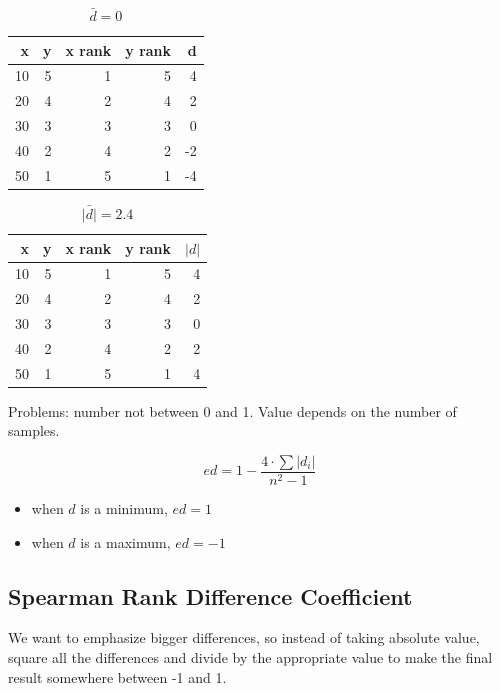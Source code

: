 \documentclass[landscape]{exam}
\begin{document}
  \begin{table}[H]
    \centering
    \begin{tabular}{rrrrr}
      \toprule
      x  & y & x rank & y rank & d \\
      \midrule
      10 & 5 & 1      & 5      & 4 \\
      20 & 4 & 2      & 4      & 2 \\
      30 & 3 & 3      & 3      & 0 \\
      40 & 2 & 4      & 2      & -2 \\
      50 & 1 & 5      & 1      & -4 \\
      \bottomrule
    \end{tabular}
    \caption{$\bar{d} = 0$}
  \end{table}

  \begin{table}[H]
    \centering
    \begin{tabular}{rrrrr}
      \toprule
      x  & y & x rank & y rank & $|d|$ \\
      \midrule
      10 & 5 & 1      & 5      & 4 \\
      20 & 4 & 2      & 4      & 2 \\
      30 & 3 & 3      & 3      & 0 \\
      40 & 2 & 4      & 2      & 2 \\
      50 & 1 & 5      & 1      & 4 \\
      \bottomrule
    \end{tabular}
    \caption{$\bar{|d|} = 2.4$}
  \end{table}

  Problems: number not between 0 and 1. Value depends on the number of samples.

  \[
    ed = 1 - \frac{4 \cdot \sum |d_i|}{n^2 - 1}
  \]

  \begin{itemize}
    \item when $d$ is a minimum, $ed = 1$ 
    \item when $d$ is a maximum, $ed = -1$ 
  \end{itemize}

  \subsection{Spearman Rank Difference Coefficient} 
  
  We want to emphasize bigger differences, so instead of taking absolute value,
  square all the differences and divide by the appropriate value to make the
  final result somewhere between -1 and 1.
\end{document}
